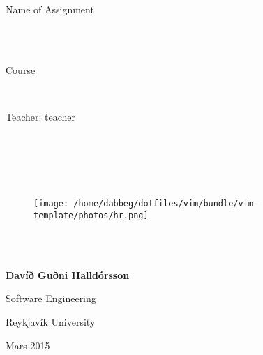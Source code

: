 \documentclass[12pt,a4paper]{report}
\newcommand{\authors}{Davíð Guðni Halldórsson}
\newcommand{\assignment}{Name of Assignment}
\newcommand{\course}{Course}
\newcommand{\teacher}{teacher}
\newcommand{\curdate}{Mars 2015}
\begin{document}
\begin{titlepage}
    ~\\
    ~\\
    ~\\
    ~\\
    \centerline{\LARGE \assignment}\\
    ~\\
    \centerline{\Large \course}\\
    \centerline{\large Teacher: \teacher}\\
    ~\\
    ~\\
    ~\\
     
    \begin{figure}[h!]
        \center
        \texttt{[image: /home/dabbeg/dotfiles/vim/bundle/vim-template/photos/hr.png]}
    \end{figure}
    
    ~\\
    ~\\

    \centerline{\large \textbf{\authors}}
    \centerline{Software Engineering}
    \centerline{Reykjavík University}

    \centerline{\curdate}
    ~\\
    ~\\
    ~\\
    ~\\
    
\end{titlepage}

\end{document}
